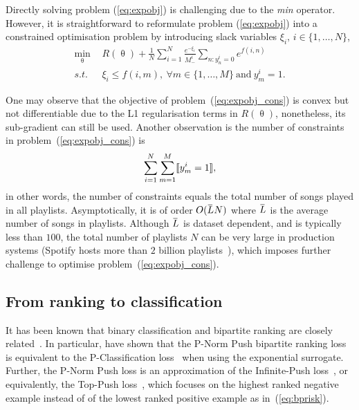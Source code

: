 Directly solving problem (\ref{eq:expobj}) is challenging due to the \emph{min} operator.
However, it is straightforward to reformulate problem (\ref{eq:expobj}) into a constrained optimisation problem
by introducing slack variables $\xi_i, \, i \in \{1,\dots,N\}$,
\begin{equation}
\label{eq:expobj_cons}
\begin{aligned}
\min_{\uptheta} \ \, & R(\uptheta) + \frac{1}{N} \sum_{i=1}^N \frac{e^{-\xi_i}}{M_-^i} \sum_{n: y_n^i = 0} e^{f(i, n)} \\
s.t. \ \, & \xi_i \le f(i, m), \ \forall m \in \{1,\dots,M\} \ \text{and} \ y_m^i = 1.
\end{aligned}
\end{equation}

One may observe that the objective of problem~(\ref{eq:expobj_cons}) is convex but not differentiable due to the L1 regularisation terms in $R(\uptheta)$,
nonetheless, its sub-gradient can still be used.
Another observation is the number of constraints in problem~(\ref{eq:expobj_cons}) is 
$$
\sum_{i=1}^N \sum_{m=1}^M \llbracket y_m^i = 1 \rrbracket,
$$
in other words, the number of constraints equals the total number of songs played in all playlists.
Asymptotically, it is of order $O(\widebar{L} N)$ where $\widebar{L}$ is the average number of songs in playlists.
Although $\widebar{L}$ is dataset dependent, and is typically less than $100$, 
the total number of playlists $N$ can be very large in production systems (\eg Spotify hosts more than $2$ billion playlists~\cite{recsysch2018}),
which imposes further challenge to optimise problem~(\ref{eq:expobj_cons}).




\subsection{From ranking to classification}

It has been known that binary classification and bipartite ranking are
closely related~\cite{ertekin2011equivalence,menon2016bipartite}.
In particular, \citet{ertekin2011equivalence} have shown that the P-Norm Push bipartite ranking loss~\cite{rudin2009p}
is equivalent to the P-Classification loss~\cite{ertekin2011equivalence} when using the exponential surrogate.
Further, the P-Norm Push loss is an approximation of the Infinite-Push loss~\cite{agarwal2011infinite},
or equivalently, the Top-Push loss~\cite{li2014top}, which focuses on the highest ranked negative example instead of
of the lowest ranked positive example as in~(\ref{eq:bprisk}).

